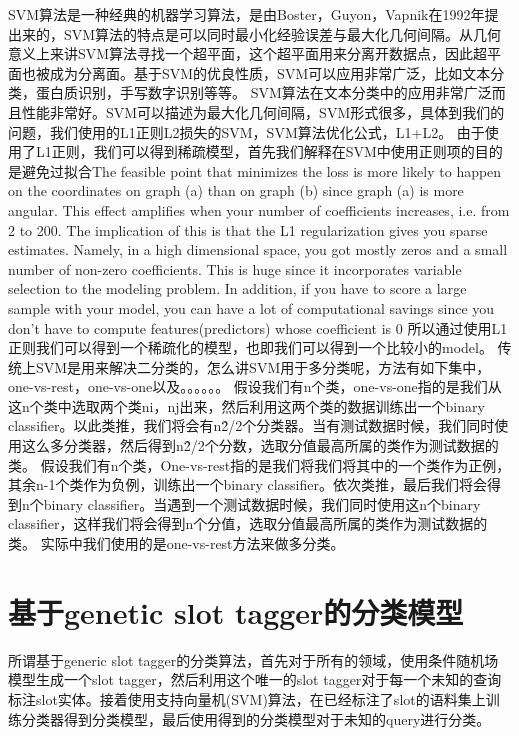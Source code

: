 \documentclass[master]{njuthesis}
\begin{document}
SVM算法是一种经典的机器学习算法，是由Boster，Guyon，Vapnik在1992年提出来的，SVM算法的特点是可以同时最小化经验误差与最大化几何间隔。从几何意义上来讲SVM算法寻找一个超平面，这个超平面用来分离开数据点，因此超平面也被成为分离面。基于SVM的优良性质，SVM可以应用非常广泛，比如文本分类，蛋白质识别，手写数字识别等等。
SVM算法在文本分类中的应用非常广泛而且性能非常好。SVM可以描述为最大化几何间隔，SVM形式很多，具体到我们的问题，我们使用的L1正则L2损失的SVM，SVM算法优化公式，L1+L2。
由于使用了L1正则，我们可以得到稀疏模型，首先我们解释在SVM中使用正则项的目的是避免过拟合The feasible point that minimizes the loss is more likely to happen on the coordinates on graph (a) than on graph (b) since graph (a) is more angular.  This effect amplifies when your number of coefficients increases, i.e. from 2 to 200. The implication of this is that the L1 regularization gives you sparse estimates. Namely, in a high dimensional space, you got mostly zeros and a small number of non-zero coefficients. This is huge since it incorporates variable selection to the modeling problem. In addition, if you have to score a large sample with your model, you can have a lot of computational savings since you don't have to compute features(predictors) whose coefficient is 0
所以通过使用L1正则我们可以得到一个稀疏化的模型，也即我们可以得到一个比较小的model。
传统上SVM是用来解决二分类的，怎么讲SVM用于多分类呢，方法有如下集中，one-vs-rest，one-vs-one以及。。。。。。
假设我们有n个类，one-vs-one指的是我们从这n个类中选取两个类ni，nj出来，然后利用这两个类的数据训练出一个binary classifier。以此类推，我们将会有n\^2/2个分类器。当有测试数据时候，我们同时使用这么多分类器，然后得到n\^2/2个分数，选取分值最高所属的类作为测试数据的类。
假设我们有n个类，One-vs-rest指的是我们将我们将其中的一个类作为正例，其余n-1个类作为负例，训练出一个binary classifier。依次类推，最后我们将会得到n个binary classifier。当遇到一个测试数据时候，我们同时使用这n个binary classifier，这样我们将会得到n个分值，选取分值最高所属的类作为测试数据的类。
实际中我们使用的是one-vs-rest方法来做多分类。


\section{基于genetic slot tagger的分类模型}

    所谓基于generic slot tagger的分类算法，首先对于所有的领域，使用条件随机场模型生成一个slot tagger，然后利用这个唯一的slot tagger对于每一个未知的查询标注slot实体。接着使用支持向量机(SVM)算法，在已经标注了slot的语料集上训练分类器得到分类模型，最后使用得到的分类模型对于未知的query进行分类。
    
\end{document}
